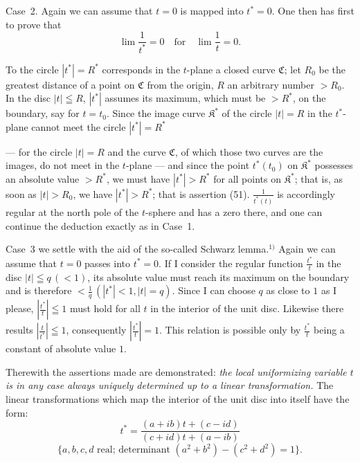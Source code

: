 \documentclass{article}
\begin{document}
Case~2. Again we can assume that $t = 0$ is mapped into $t^* = 0$. One then has first to prove that
\[ \lim \frac{1}{t^*} = 0 \quad \text{for} \quad \lim \frac{1}{t} = 0. \tag{51} \]


To the circle $|t^*| = R^*$ corresponds in the $t$-plane a closed curve $\mathfrak{C}$; let $R_0$ be the greatest distance of a point on $\mathfrak{C}$ from the origin, $R$ an arbitrary number $> R_0$. In the disc $|t| \leqq R$, $|t^*|$ assumes its maximum, which must be $> R^*$, on the boundary, say for $t = t_0$. Since the image curve $\mathfrak{K}^*$ of the circle $|t| = R$ in the $t^*$-plane cannot meet the circle $|t^*| = R^*$

--- for the circle $|t| = R$ and the curve $\mathfrak{C}$, of which those two curves are the images, do not meet in the $t$-plane --- and since the point $t^*(t_0)$ on $\mathfrak{K}^*$ possesses an absolute value $> R^*$, we must have $|t^*| > R^*$ for all points on $\mathfrak{K}^*$; that is, as soon as $|t| > R_0$, we have $|t^*| > R^*$; that is assertion (51). $\frac{1}{t^*(t)}$ is accordingly regular at the north pole of the $t$-sphere and has a zero there, and one can continue the deduction exactly as in Case~1.

Case~3 we settle with the aid of the so-called Schwarz lemma.${}^{1)}$ Again we can assume that $t = 0$ passes into $t^* = 0$. If I consider the regular function $\frac{t^*}{t}$ in the disc $|t| \leqq q\,(< 1)$, its absolute value must reach its maximum on the boundary and is therefore $< \frac{1}{q}\,(|t^*| < 1, |t| = q)$. Since I can choose $q$ as close to $1$ as I please, $\left| \frac{t^*}{t} \right| \leqq 1$ must hold for all $t$ in the interior of the unit disc. Likewise there results $\left| \frac{t}{t^*} \right| \leqq 1$, consequently $\left| \frac{t^*}{t} \right| = 1$. This relation is possible only by $\frac{t^*}{t}$ being a constant of absolute value $1$.

Therewith the assertions made are demonstrated: \emph{the local uniformizing variable $t$ is in any case always uniquely determined up to a linear transformation.} The linear transformations which map the interior of the unit disc into itself have the form:
\[ t^* = \frac{(a + ib)t + (c - id)}{(c + id)t + (a - ib)} \tag{52} \]
\[ \{ a, b, c, d \text{ real; determinant } (a^2 + b^2) - (c^2 + d^2) = 1 \}. \]
\end{document}

